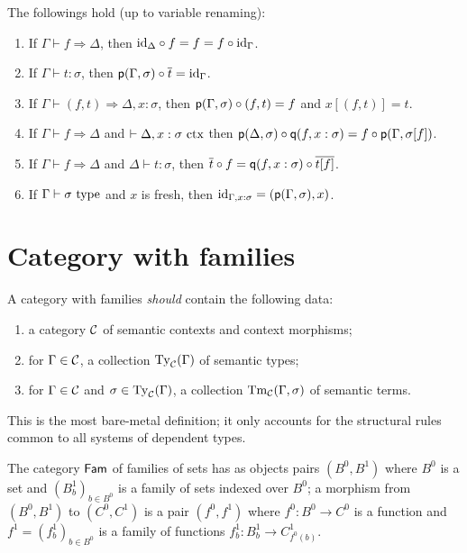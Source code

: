 \documentclass[a4paper]{article}
\begin{document}
\begin{proposition}
  The followings hold (up to variable renaming):
  \begin{enumerate}
  \item If $\Gamma \vdash f \Rightarrow \Delta$, then $\mathrm{id}_{\Delta} \circ f = f = f \circ \mathrm{id}_{\Gamma}$.
  \item If $\Gamma \vdash t : \sigma$, then $\operatorname{\mathsf{p}}(\Gamma,\sigma) \circ \overline{t} = \mathrm{id}_{\Gamma}$.
  \item If $\Gamma \vdash (f,t) \Rightarrow \Delta,x : \sigma$, then $\operatorname{\mathsf{p}}(\Gamma,\sigma) \circ (f, t) = f$ and $x[(f,t)] = t$.
  \item If $\Gamma \vdash f \Rightarrow \Delta$ and $\vdash \Delta,x : \sigma~\mathrm{ctx}$ then $\operatorname{\mathsf{p}}(\Delta,\sigma) \circ \operatorname{\mathsf{q}}(f,x:\sigma) = f \circ \operatorname{\mathsf{p}}(\Gamma,\sigma[f])$.
  \item If $\Gamma \vdash f \Rightarrow \Delta$ and $\Delta \vdash t : \sigma$, then $\overline{t} \circ f = \operatorname{\mathsf{q}}(f,x : \sigma) \circ \overline{t[f]}$.
  \item If $\Gamma \vdash \sigma~\mathrm{type}$ and $x$ is fresh, then $\mathrm{id}_{\Gamma,x:\sigma} = (\operatorname{\mathsf{p}}(\Gamma,\sigma),x)$.
  \end{enumerate}
\end{proposition}

\section{Category with families}\label{sec:cwf}

A category with families \emph{should} contain the following data:
\begin{enumerate}
\item a category $\mathcal{C}$ of semantic contexts and context morphisms;
\item for $\Gamma \in \mathcal{C}$, a collection $\operatorname{Ty}_{\mathcal{C}}(\Gamma)$ of semantic types;
\item for $\Gamma \in \mathcal{C}$ and $\sigma \in \operatorname{Ty}_{\mathcal{C}}(\Gamma)$, a collection $\operatorname{Tm}_{\mathcal{C}}(\Gamma,\sigma)$ of semantic terms.
\end{enumerate}

This is the most bare-metal definition; it only accounts for the structural rules common to all systems of dependent types.

\begin{definition}
  The category $\mathsf{Fam}$ of families of sets has as objects pairs $(B^0,B^1)$ where $B^0$ is a set and $(B^1_b)_{b \in B^0}$ is a family of sets indexed over $B^0$; a morphism from $(B^0,B^1)$ to $(C^0,C^1)$ is a pair $(f^0,f^1)$ where $f^0 : B^0 \to C^0$ is a function and $f^1 = (f^1_b)_{b \in B^0}$ is a family of functions $f^1_b : B^1_b \to C^1_{f^0(b)}$.
\end{definition}
\end{document}
